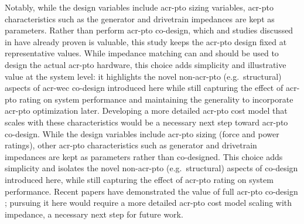\ifdefined\DISSERTATION
    Notably, while the design variables include \gls{acr-pto} sizing variables, \gls{acr-pto} characteristics such as the generator and drivetrain impedances are kept as parameters.
    Rather than perform \gls{acr-pto} co-design, which \citet{coe_useful_2023,gaebele_incorporating_2023} and studies discussed in  have already proven is valuable, this study keeps the \gls{acr-pto} design fixed at representative values.
    While impedance matching can and should be used to design the actual \gls{acr-pto} hardware, this choice adds simplicity and illustrative value at the system level: it highlights the novel non-\gls{acr-pto} (e.g.\ structural) aspects of \gls{acr-wec} co-design introduced here while still capturing the effect of \gls{acr-pto} rating on system performance and maintaining the generality to incorporate \gls{acr-pto} optimization later.
    Developing a more detailed \gls{acr-pto} cost model that scales with these characteristics would be a necessary next step toward \gls{acr-pto} co-design.
\else
    While the design variables include \gls{acr-pto} sizing (force and power ratings), other \gls{acr-pto} characteristics such as generator and drivetrain impedances are kept as parameters rather than co-designed.
    This choice adds simplicity and isolates the novel non-\gls{acr-pto} (e.g.\ structural) aspects of co-design introduced here, while still capturing the effect of \gls{acr-pto} rating on system performance. 
    Recent papers have demonstrated the value of full \gls{acr-pto} co-design \citep{coe_useful_2023,gaebele_incorporating_2023};
    pursuing it here would require a more detailed \gls{acr-pto} cost model scaling with impedance, a necessary next step for future work.
\fi


